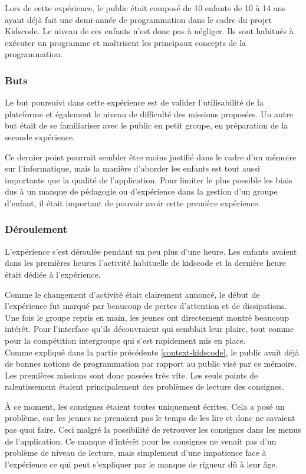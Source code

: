 Lors de cette expérience, le public était composé de 10 enfants de 10 à 14 ans ayant déjà fait une demi-année de programmation dans le cadre du projet Kidscode. Le niveau de ces enfants n'est donc pas à négliger. Ils sont habitués à exécuter un programme et maîtrisent les principaux concepts de la programmation.\\

\subsubsection{Buts}
Le but poursuivi dans cette expérience est de valider l'utilisabilité de la plateforme et également le niveau de difficulté des missions proposées. Un autre but était de se familiariser avec le public en petit groupe, en préparation de la seconde expérience.

Ce dernier point pourrait sembler être moins justifié dans le cadre d'un mémoire sur l'informatique, mais la manière d'aborder les enfants est tout aussi importante que la qualité de l'application. Pour limiter le plus possible les biais dus à un manque de pédagogie ou d'expérience dans la gestion d'un groupe d'enfant, il était important de pouvoir avoir cette première expérience.
\subsubsection{Déroulement}
L'expérience s'est déroulée pendant un peu plus d'une heure. Les enfants avaient dans les premières heures l'activité habituelle de kidscode et la dernière heure était dédiée à l'expérience. 

Comme le changement d'activité était clairement annoncé, le début de l'expérience fut marqué par beaucoup de pertes d'attention et de dissipations. Une fois le groupe repris en main, les jeunes ont directement montré beaucoup intérêt. Pour l'interface qu'ils découvraient qui semblait leur plaire, tout comme pour la compétition intergroupe qui s'est rapidement mis en place.\\

Comme expliqué dans la partie précédente \ref{context-kidscode}, le public avait déjà de bonnes notions de programmation par rapport au public visé par ce mémoire. Les premières missions sont donc passées très vite. Les seuls points de ralentissement étaient principalement des problèmes de lecture des consignes. 

À ce moment, les consignes étaient toutes uniquement écrites. Cela a posé un problème, car les jeunes ne prenaient pas le temps de les lire et donc ne savaient pas quoi faire. Ceci malgré la possibilité de retrouver les consignes dans les menus de l'application. Ce manque d'intérêt pour les consignes ne venait pas d'un problème de niveau de lecture, mais simplement d'une impatience face à l'expérience ce qui peut s'expliquer par le manque de rigueur dû à leur âge.\\

